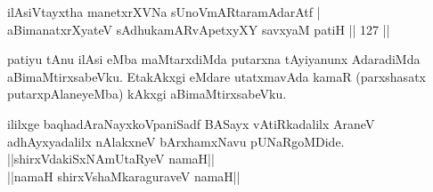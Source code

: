 \begin{shl}
ilA\s siVtayxtha manetxrXVNa sUnoVmARtaramAdarAtf | \\
aBimanatxrXyateV sAdhukamARvApetxyXY savxyaM patiH \hfill|| 127 || 
\end{shl}

\begin{artha}
patiyu tAnu ilAsi eMba maMtarxdiMda putarxna tAyiyanunx AdaradiMda 
aBimaMtirxsabeVku. EtakAkxgi eMdare utatxmavAda kamaR (parxshasatx 
putarxpAlaneyeMba) kAkxgi aBimaMtirxsabeVku.
\end{artha}

\begin{center}
ililxge baqhadAraNayxkoVpaniSadf BASayx vAtiRkadalilx AraneV 
adhAyxyadalilx nAlakxneV bArxhamxNavu pUNaRgoMDide.\\
||shirxVdakiSxNAmUtaRyeV namaH||\\
||namaH shirxVshaMkaraguraveV namaH||
\end{center}
